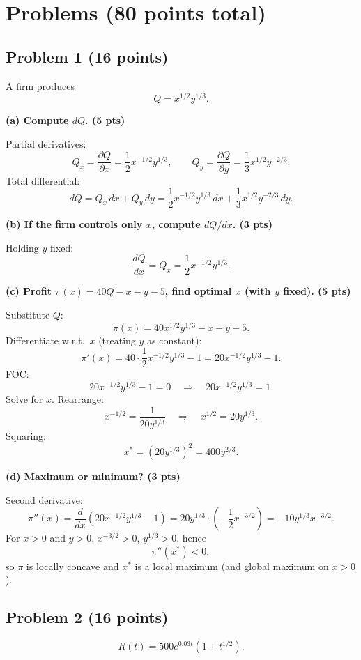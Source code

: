 \documentclass[12pt]{article}
\begin{document}
\section*{Problems (80 points total)}

\subsection*{Problem 1 (16 points)}

A firm produces
\[
Q = x^{1/2} y^{1/3}.
\]

\textbf{(a) Compute \(dQ\). (5 pts)}

Partial derivatives:
\[
Q_x = \frac{\partial Q}{\partial x}
= \frac{1}{2} x^{-1/2} y^{1/3},
\qquad 
Q_y = \frac{\partial Q}{\partial y}
= \frac{1}{3} x^{1/2} y^{-2/3}.
\]
Total differential:
\[
dQ = Q_x\,dx + Q_y\,dy
= \frac{1}{2} x^{-1/2} y^{1/3}\,dx
+ \frac{1}{3} x^{1/2} y^{-2/3}\,dy.
\]

\textbf{(b) If the firm controls only \(x\), compute \(dQ/dx\). (3 pts)}

Holding \(y\) fixed:
\[
\frac{dQ}{dx} = Q_x = \frac{1}{2} x^{-1/2} y^{1/3}.
\]

\textbf{(c) Profit \(\pi(x)=40Q - x - y - 5\), find optimal \(x\) (with \(y\) fixed). (5 pts)}

Substitute \(Q\):
\[
\pi(x) = 40 x^{1/2} y^{1/3} - x - y - 5.
\]
Differentiate w.r.t.\ \(x\) (treating \(y\) as constant):
\[
\pi'(x) = 40 \cdot \frac{1}{2} x^{-1/2} y^{1/3} - 1
= 20 x^{-1/2} y^{1/3} - 1.
\]
FOC:
\[
20 x^{-1/2} y^{1/3} - 1 = 0
\quad\Rightarrow\quad
20 x^{-1/2} y^{1/3} = 1.
\]
Solve for \(x\). Rearrange:
\[
x^{-1/2} = \frac{1}{20 y^{1/3}}
\quad\Rightarrow\quad
x^{1/2} = 20 y^{1/3}.
\]
Squaring:
\[
x^\ast = (20 y^{1/3})^2 = 400 y^{2/3}.
\]

\textbf{(d) Maximum or minimum? (3 pts)}

Second derivative:
\[
\pi''(x) = \frac{d}{dx}\left(20 x^{-1/2} y^{1/3} - 1\right)
= 20 y^{1/3} \cdot \left(-\frac{1}{2} x^{-3/2}\right)
= -10 y^{1/3} x^{-3/2}.
\]
For \(x>0\) and \(y>0\), \(x^{-3/2}>0\), \(y^{1/3}>0\), hence
\[
\pi''(x^\ast) < 0,
\]
so \(\pi\) is locally concave and \(x^\ast\) is a local maximum (and global maximum on \(x>0\)).

\bigskip

\subsection*{Problem 2 (16 points)}

\[
R(t)=500 e^{0.03 t}(1+t^{1/2}).
\]
\end{document}
